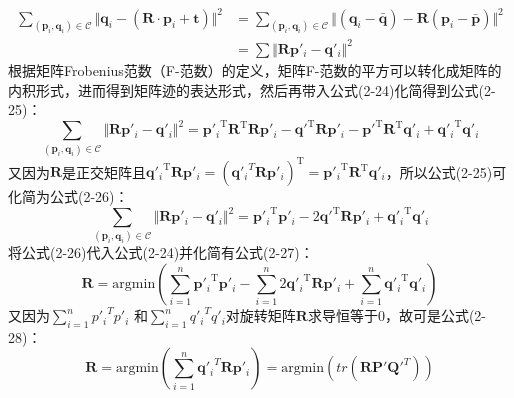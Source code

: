     \begin{equation}
        \begin{aligned}
        \sum_{(\mathbf{p}_i,\mathbf{q}_i)\in \mathcal{C}}  \Vert \mathbf{q}_i-(\mathbf{R}\cdot \mathbf{p}_i + \mathbf{t}) \Vert^2
        &=
        \sum_{(\mathbf{p}_i,\mathbf{q}_i)\in \mathcal{C}}  \Vert (\mathbf{q}_i-\mathbf{\bar{q}})-\mathbf{R}(\mathbf{p}_i-\mathbf{\bar{p}}) \Vert^2\\
        &= 
        \sum \Vert \mathbf{R}\mathbf{p}'_i-\mathbf{q}'_i \Vert^2
        \end{aligned}
    \end{equation}
    根据矩阵Frobenius范数（F-范数）的定义，矩阵F-范数的平方可以转化成矩阵的内积形式，进而得到矩阵迹的表达形式，然后再带入公式(2-24)化简得到公式(2-25)：
    \begin{equation}
        \sum_{(\mathbf{p}_i,\mathbf{q}_i)\in \mathcal{C}}  \Vert \mathbf{R}\mathbf{p}'_i-\mathbf{q}'_i \Vert^2
        =
        {\mathbf{p}'_i}^{\mathrm{T}} \mathbf{R}^{\mathrm{T}} \mathbf{R} \mathbf{p}'_i - {\mathbf{q}'}^{\mathrm{T}} \mathbf{R} \mathbf{p}'_i - {\mathbf{p}'}^{\mathrm{T}} \mathbf{R}^\mathrm{T} \mathbf{q}'_i + {\mathbf{q}'_i}^\mathrm{T} \mathbf{q}'_i
    \end{equation}
    又因为$\mathbf{R}$是正交矩阵且${\mathbf{q}'_i}^\mathrm{T} \mathbf{R} \mathbf{p}'_i = ({\mathbf{q}'_i}^T \mathbf{R} \mathbf{p}'_i)^\mathrm{T} = {\mathbf{p}'_i}^\mathrm{T} \mathbf{R}^\mathrm{T} \mathbf{q}'_i$，所以公式(2-25)可化简为公式(2-26)：
    \begin{equation}
        \sum_{(\mathbf{p}_i,\mathbf{q}_i)\in \mathcal{C}}  \Vert \mathbf{R}\mathbf{p}'_i-\mathbf{q}'_i \Vert^2
        =
        {\mathbf{p}'_i}^\mathrm{T} \mathbf{p}'_i - 2 {\mathbf{q}'}^\mathrm{T} \mathbf{R} \mathbf{p}'_i + {\mathbf{q}'_i}^\mathrm{T} \mathbf{q}'_i
    \end{equation}
    将公式(2-26)代入公式(2-24)并化简有公式(2-27)：
    \begin{equation}
        \mathbf{R}
        = 
        \mathrm{argmin}(\sum_{i=1}^n {\mathbf{p}'_i}^\mathrm{T} \mathbf{p}'_i - \sum_{i=1}^{n} 2{\mathbf{q}'_i}^\mathrm{T} \mathbf{R} \mathbf{p}'_i + \sum_{i=1}^n {\mathbf{q}'_i}^\mathrm{T} \mathbf{q}'_i)
    \end{equation}
    又因为$\sum_{i=1}^n {p'_i}^T p'_i$ 和$\sum_{i=1}^n {q'_i}^T q'_i$对旋转矩阵$\mathbf{R}$求导恒等于0，故可是公式(2-28)：
    \begin{equation}
        \mathbf{R}
        = 
        \mathrm{argmin}(\sum_{i=1}^n {\mathbf{q}'_i}^T \mathbf{R} \mathbf{p}'_i)
        =
        \mathrm{argmin}(tr(\mathbf{R} \mathbf{P}' \mathbf{Q}'^{T}))
    \end{equation}
